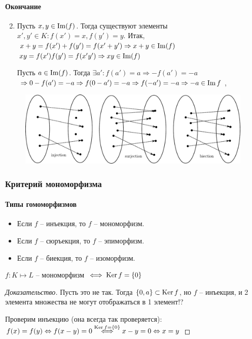\begin{frame}[t]
    \framesubtitle{Окончание}
    
    \begin{enumerate}
        \setcounter{enumi}{1}
        \item Пусть $x,y \in \operatorname{Im} (f)$. Тогда существуют элементы $x', y' \in K: f(x') = x, f(y') = y$. Итак, $x + y = f(x') + f(y') = f(x' + y') \Rightarrow x + y \in \operatorname{Im} (f)$
            $xy = f(x')f(y') = f(x'y') \Rightarrow xy \in \operatorname{Im} (f)$
            
            \vspace{0.2cm}
            Пусть $a \in \operatorname{Im} (f)$. Тогда $\exists a': f(a') = a \Rightarrow -f(a') = -a$ $ \Rightarrow 0 - f(a') = -a \Rightarrow f(0 - a') = -a \Rightarrow f(-a') = -a \Rightarrow -a \in \operatorname{Im} f$,\hfill \qedsymbol{}
    \end{enumerate}

    \begin{figure}[h]
        \centering
        \includegraphics[width=\textwidth]{images/path3}
        \label{fig:path3}
    \end{figure}
\end{frame}

\begin{frame}[t]
    \frametitle{\normalsize \bf Критерий мономорфизма}
    \framesubtitle{Типы гомоморфизмов}
    \begin{itemize}
        \item 
        Если $f$ -- инъекция, то $f$ -- мономорфизм.

        \item  
        Если $f$ -- сюръекция, то $f$ -- эпиморфизм.
        
        \item  
        Если $f$ -- биекция, то $f$ -- изоморфизм.
    \end{itemize}

    \setcounter{lemma}{3}
    \begin{lemma}
        $f: K \mapsto  L $ -- мономорфизм $\iff \operatorname{Ker} f = \left\{ 0 \right \}  $
    \end{lemma}

    \begin{proof}[Доказательство]
        \fbox{$ \Rightarrow $} Пусть это не так. Тогда $\left\{ 0, a \right \}  \subset \operatorname{Ker} f$, но $f$ -- инъекция, и 2 элемента множества не могут отображаться в 1 элемент!?
        
        \fbox{$ \Leftarrow $} Проверим инъекцию (она всегда так проверяется): $f(x) = f(y) \Leftrightarrow f(x - y) = 0 \overset{\operatorname{Ker} f = \left\{ 0 \right \} } \iff x - y = 0 \Leftrightarrow x = y$
    \end{proof}
    
\end{frame}

